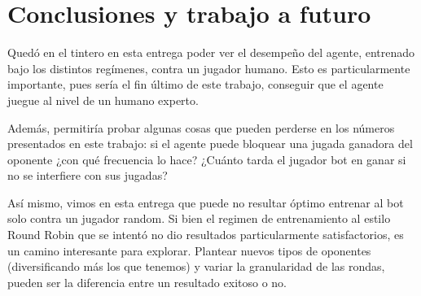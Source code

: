 \documentclass[10pt,a4paper]{article}
\begin{document}
\section{Conclusiones y trabajo a futuro}
Quedó en el tintero en esta entrega poder ver el desempeño del agente, entrenado bajo los distintos regímenes, contra un jugador humano. Esto es particularmente importante, pues sería el fin último de este trabajo, conseguir que el agente juegue al nivel de un humano experto. 

Además,  permitiría probar algunas cosas que pueden perderse en los números presentados en este trabajo: si el agente puede bloquear una jugada ganadora del oponente ¿con qué frecuencia lo hace? ¿Cuánto tarda el jugador bot en ganar si no se interfiere con sus jugadas?

Así mismo, vimos en esta entrega que puede no resultar óptimo entrenar al bot solo contra un jugador random. Si bien el regimen de entrenamiento al estilo Round Robin que se intentó no dio resultados particularmente satisfactorios, es un camino interesante para explorar. Plantear nuevos tipos de oponentes (diversificando más los que tenemos) y variar la granularidad de las rondas, pueden ser la diferencia entre un resultado exitoso o no.
\end{document}
